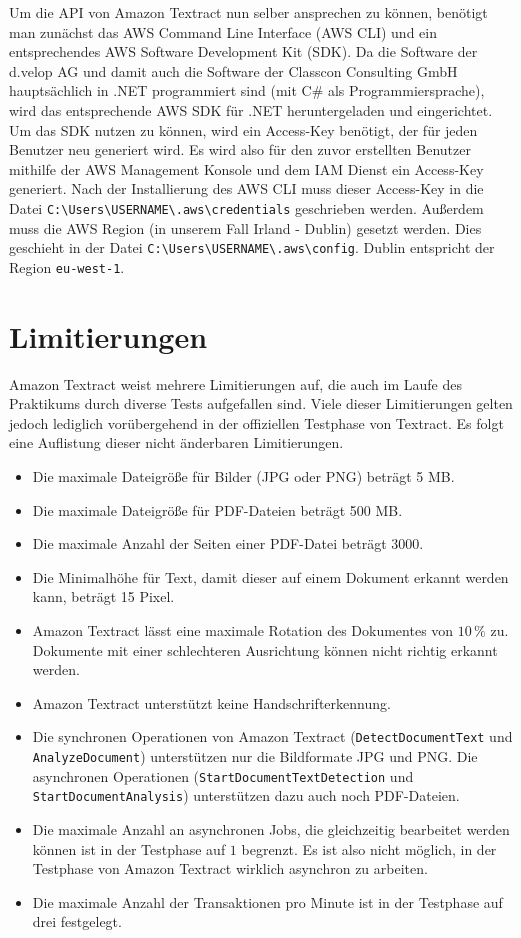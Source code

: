 \documentclass{whswinvcbook}
\begin{document}
Um die API von Amazon Textract nun selber ansprechen zu können, benötigt man zunächst das AWS Command Line Interface (AWS CLI) und ein entsprechendes AWS Software Development Kit (SDK). Da die Software der d.velop AG und damit auch die Software der Classcon Consulting GmbH hauptsächlich in .NET programmiert sind (mit C\# als Programmiersprache), wird das entsprechende AWS SDK für .NET heruntergeladen und eingerichtet. Um das SDK nutzen zu können, wird ein Access-Key benötigt, der für jeden Benutzer neu generiert wird. Es wird also für den zuvor erstellten Benutzer mithilfe der AWS Management Konsole und dem IAM Dienst ein Access-Key generiert. Nach der Installierung des AWS CLI muss dieser Access-Key in die Datei \texttt{C:\textbackslash Users\textbackslash USERNAME\textbackslash .aws\textbackslash credentials} geschrieben werden. Außerdem muss die AWS Region (in unserem Fall Irland - Dublin) gesetzt werden. Dies geschieht in der Datei \texttt{C:\textbackslash Users\textbackslash USERNAME\textbackslash .aws\textbackslash config}. Dublin entspricht der Region \texttt{eu-west-1}.
\section{Limitierungen}
Amazon Textract weist mehrere Limitierungen auf, die auch im Laufe des Praktikums durch diverse Tests aufgefallen sind. Viele dieser Limitierungen gelten jedoch lediglich vorübergehend in der offiziellen Testphase von Textract. Es folgt eine Auflistung dieser nicht änderbaren Limitierungen.
\begin{itemize}
    \item Die maximale Dateigröße für Bilder (JPG oder PNG) beträgt 5 MB.
    \item Die maximale Dateigröße für PDF-Dateien beträgt 500 MB.
    \item Die maximale Anzahl der Seiten einer PDF-Datei beträgt 3000.
    \item Die Minimalhöhe für Text, damit dieser auf einem Dokument erkannt werden kann, beträgt 15 Pixel.
    \item Amazon Textract lässt eine maximale Rotation des Dokumentes von $10\,\%$ zu. Dokumente mit einer schlechteren Ausrichtung können nicht richtig erkannt werden.
    \item Amazon Textract unterstützt keine Handschrifterkennung.
    \item Die synchronen Operationen von Amazon Textract (\texttt{DetectDocumentText} und \texttt{AnalyzeDocument}) unterstützen nur die Bildformate JPG und PNG. Die asynchronen Operationen (\texttt{StartDocumentTextDetection} und \texttt{StartDocumentAnalysis}) unterstützen dazu auch noch PDF-Dateien.
    \item Die maximale Anzahl an asynchronen Jobs, die gleichzeitig bearbeitet werden können ist in der Testphase auf $1$ begrenzt. Es ist also nicht möglich, in der Testphase von Amazon Textract wirklich asynchron zu arbeiten.
    \item Die maximale Anzahl der Transaktionen pro Minute ist in der Testphase auf drei festgelegt.
\end{itemize}
\end{document}
